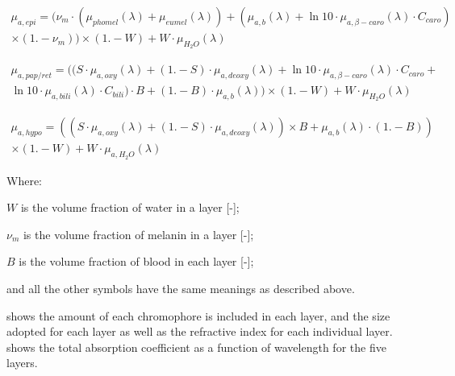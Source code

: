 \begin{equation}
\begin{split}
\mu_{a,epi}= (\nu_m \cdot (\mu_{phomel}(\lambda) + \mu_{eumel}(\lambda)) + (\mu_{a,b}(\lambda) + \ln10 \cdot \mu_{a,\beta-caro}(\lambda) \cdot C_{caro}) \\ \times (1. - \nu_m)) \times(1. - W) + W \cdot \mu_{H_2O}(\lambda)
\end{split}
\label{eqn:epiabs}
\end{equation}

\begin{equation}
\begin{split}
\mu_{a,pap/ret}=((S \cdot \mu_{a,oxy}(\lambda) + (1. - S) \cdot \mu_{a,deoxy}(\lambda) + \ln10 \cdot \mu_{a,\beta-caro}(\lambda) \cdot C_{caro} + \\ \ln10 \cdot \mu_{a,bili}(\lambda)\cdot C_{bili})\cdot B +  (1. - B)\cdot \mu_{a,b}(\lambda)) \times (1. - W) + W \cdot \mu_{H_2O}(\lambda)
\end{split}
\label{eqn:dermisabs}
\end{equation}

\begin{equation}
\begin{split}
\mu_{a,hypo}=((S\cdot \mu_{a,oxy}(\lambda) + (1. - S) \cdot \mu_{a,deoxy}(\lambda)) \times B + \mu_{a,b}(\lambda) \cdot (1. - B))\\ \times (1. - W) + W \cdot \mu_{a,H_2O}(\lambda)
\end{split}
\label{eqn:hypoabs}
\end{equation}

\noindent Where:

\indent $W$ is the volume fraction of water in a layer [-];

\indent $\nu_m$ is the volume fraction of melanin in a layer [-];

\indent $B$ is the volume fraction of blood in each layer [-];

\indent and all the other symbols have the same meanings as described above.

\medskip

 shows the amount of each chromophore is included in each layer, and the size adopted for each layer as well as the refractive index for each individual layer.
 shows the total absorption coefficient as a function of wavelength for the five layers.


